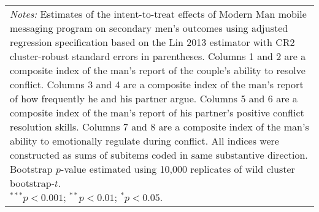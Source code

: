 \begin{tabular}{l c c c c c c c c}
\bottomrule
\multicolumn{9}{l}{\scriptsize{\parbox{\linewidth}{\vspace{2pt}
       \textit{Notes:} Estimates of the intent-to-treat effects of Modern Man mobile
       messaging program on secondary men's outcomes using adjusted regression
       specification based on the Lin 2013 estimator with CR2 cluster-robust
       standard errors in parentheses. Columns 1 and 2 are a composite index of
       the man's report of the couple's ability to resolve conflict. Columns 3 and 4
       are a composite index of the man's report of how frequently he and his partner argue. 
       Columns 5 and 6 are a composite index of the man's report of his partner's positive conflict 
       resolution skills. Columns 7 and 8 are a composite index of the man's ability to emotionally regulate
       during conflict. All indices were constructed as sums of subitems coded in same 
       substantive direction. Bootstrap $p$-value estimated using 10,000 replicates of wild cluster
       bootstrap-$t$. \\ $^{***}p<0.001$; $^{**}p<0.01$; $^{*}p<0.05$.}}}
\end{tabular}
